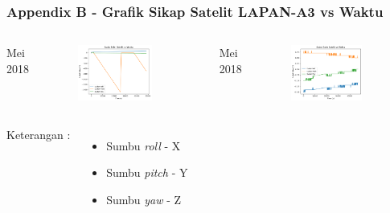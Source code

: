 \documentclass[8pt]{beamer}
\begin{document}
\begin{frame}
  \frametitle{Appendix B - Grafik Sikap Satelit LAPAN-A3 vs Waktu}
  \begin{columns}[T]
     Mei 2018
      \begin{figure}
          \includegraphics[width=0.8\textwidth]{figure/attitude_2018-05-19.png}
      \end{figure}
     Mei 2018
      \begin{figure}
          \includegraphics[width=0.8\textwidth]{figure/attitude_2018-05-20.png}
      \end{figure}
  \end{columns}
  \begin{columns}[T]
    \center Keterangan :
    \begin{itemize}
      \item Sumbu \textit{roll} - X
      \item Sumbu \textit{pitch} - Y
      \item Sumbu \textit{yaw} - Z
    \end{itemize}
  \end{columns}
\end{frame}
\end{document}

